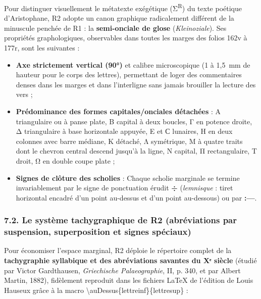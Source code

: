 \documentclass[11pt, a4paper, twoside]{article}
\renewcommand{\_}{\origunderscore\penalty0\relax}
\renewcommand{\texttt}[1]{#1}
\newcommand{\Run}{\textbf{R}\textsuperscript{1}}
\newcommand{\Rdeux}{\textbf{R}\textsuperscript{2}}
\def\Run{R1}%
\def\Rdeux{R2}%
\begin{document}
Pour distinguer visuellement le métatexte exégétique (Σ\textsuperscript{R}) du texte poétique d'Aristophane, \Rdeux{} adopte un canon graphique radicalement différent de la minuscule penchée de \Run{} : la \textbf{semi-onciale de glose} (\textit{Kleinoziale}).
Ses propriétés graphologiques, observables dans toutes les marges des folios \texttt{162v} à \texttt{177r}, sont les suivantes :
\begin{itemize}[leftmargin=1.5em, itemsep=2pt]
  \item \textbf{Axe strictement vertical (90°)} et calibre microscopique (1 à 1,5~mm de hauteur pour le corps des lettres), permettant de loger des commentaires denses dans les marges et dans l'interligne sans jamais brouiller la lecture des vers ;
  \item \textbf{Prédominance des formes capitales/onciales détachées} : \texttt{Α} triangulaire ou à panse plate, \texttt{Β} capital à deux boucles, \texttt{Γ} en potence droite, \texttt{Δ} triangulaire à base horizontale appuyée, \texttt{Ε} et \texttt{Ϲ} lunaires, \texttt{Η} en deux colonnes avec barre médiane, \texttt{Κ} détaché, \texttt{Λ} symétrique, \texttt{Μ} à quatre traits dont le chevron central descend jusqu'à la ligne, \texttt{Ν} capital, \texttt{Π} rectangulaire, \texttt{Τ} droit, \texttt{Ω} en double coupe plate ;
  \item \textbf{Signes de clôture des scholies} : Chaque scholie marginale se termine invariablement par le signe de ponctuation érudit \textbf{\texttt{÷}} (\textit{lemnisque} : tiret horizontal encadré d'un point au-dessus et d'un point au-dessous) ou par \textbf{\texttt{:—}}.
\end{itemize}


\subsubsection{7.2. Le système tachygraphique de \Rdeux{} (abréviations par suspension, superposition et signes spéciaux)}

Pour économiser l'espace marginal, \Rdeux{} déploie le répertoire complet de la \textbf{tachygraphie syllabique et des abréviations savantes du Xᵉ siècle} (étudié par Victor Gardthausen, \textit{Griechische Palaeographie}, II, p. 340, et par Albert Martin, 1882), fidèlement reproduit dans les fichiers LaTeX de l'édition de Louis Hauseux grâce à la macro \texttt{\textbackslash auDessus\{lettre\_inf\}\{lettre\_sup\}} :
\end{document}
